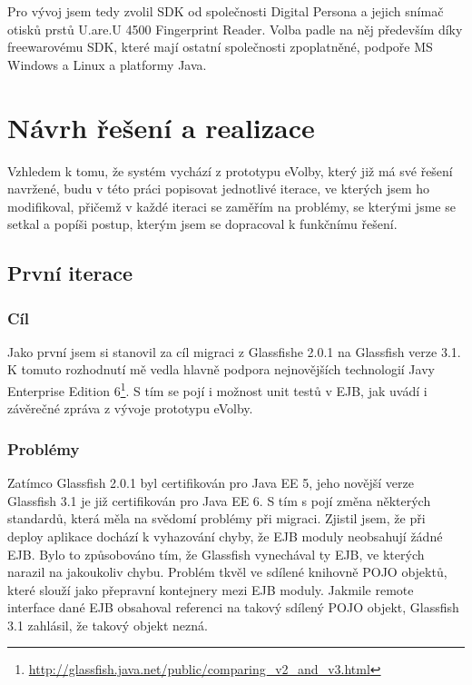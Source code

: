 \documentclass[11pt,twoside,a4paper]{book}
\begin{document}
Pro vývoj jsem tedy zvolil SDK od společnosti Digital Persona a jejich snímač otisků prstů U.are.U 4500 Fingerprint Reader. Volba padle na něj především díky freewarovému SDK, které mají ostatní společnosti zpoplatněné, podpoře MS Windows a Linux a platformy Java.

\chapter{Návrh řešení a realizace}

Vzhledem k tomu, že systém vychází z prototypu eVolby, který již má své řešení navržené, budu v této práci popisovat jednotlivé iterace, ve kterých jsem ho modifikoval, přičemž v každé iteraci se zaměřím na problémy, se kterými jsme se setkal a popíši postup, kterým jsem se dopracoval k funkčnímu řešení. 

\section{První iterace}

\subsection{Cíl}

Jako první jsem si stanovil za cíl migraci z Glassfishe 2.0.1 na Glassfish verze 3.1. K tomuto rozhodnutí mě vedla hlavně podpora nejnovějších technologií Javy Enterprise Edition 6\footnote{\url{http://glassfish.java.net/public/comparing_v2_and_v3.html}}. S tím se pojí i možnost unit testů v EJB, jak uvádí i závěrečné zpráva z vývoje prototypu eVolby\cite{www:prototyp}.

\subsection{Problémy}

Zatímco Glassfish 2.0.1 byl certifikován pro Java EE 5, jeho novější verze Glassfish 3.1 je již certifikován pro Java EE 6. S tím s pojí změna některých standardů, která měla na svědomí problémy při migraci. Zjistil jsem, že při deploy aplikace dochází k vyhazování chyby, že EJB moduly neobsahují žádné EJB. Bylo to způsobováno tím, že Glassfish vynechával ty EJB, ve kterých narazil na jakoukoliv chybu. Problém tkvěl ve sdílené knihovně POJO objektů, které slouží jako přepravní kontejnery mezi EJB moduly. Jakmile remote interface dané EJB obsahoval referenci na takový sdílený POJO objekt, Glassfish 3.1 zahlásil, že takový objekt nezná.
\end{document}
